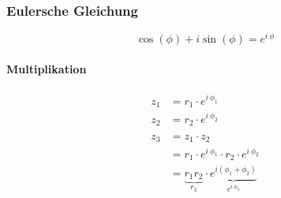 \subsubsection{Eulersche Gleichung}

\[
	\cos(\phi) + i \sin(\phi) = e^{i\ \phi}
\]

\paragraph{Multiplikation}

\begin{align*}
	z_1 & = r_1 \cdot e^{i\ \phi_1}                                                              \\
	z_2 & = r_2 \cdot e^{i\ \phi_2}                                                              \\
	\\
	z_3 & = z_1 \cdot z_2                                                                        \\
	    & = r_1 \cdot e^{i\ \phi_1} \cdot r_2 \cdot e^{i\ \phi_2}                                \\
	    & = \underbrace{r_1 r_2}_{r_3} \cdot \underbrace{e^{i(\phi_1 + \phi_2)}}_{e^{i\ \phi_3}}
\end{align*}

